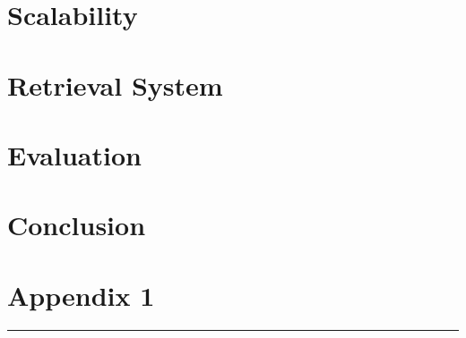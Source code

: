 \documentclass{article}
\begin{document}
\section{Scalability}
\label{section:scalability}


\section{Retrieval System}
\label{section:retrieval-system}


\section{Evaluation}
\label{section:evaluation}


\section{Conclusion}
\label{section:conclusions}


\pagebreak



\pagebreak
\appendix
\section{Appendix 1}
\hrule

\end{document}
